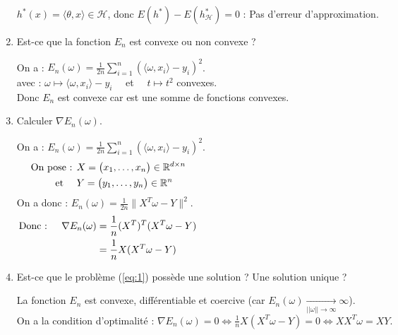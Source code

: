 \documentclass[12pt,a4paper]{article}
\begin{document}
\begin{enumerate}
    $h^*(x) = \langle \theta, x \rangle \in \mathcal{H}$, donc $E(h^*) - E(h^*_\mathcal{H}) = 0$ : Pas d'erreur d'approximation.\\
    

    \color{black}
    \item Est-ce que la fonction $E_n$ est convexe ou non convexe ?
    
    \color{blue}
    On a : $E_n(\omega) = \frac{1}{2n} \sum_{i = 1}^{n} (\langle \omega, x_i \rangle - y_i)^2$.\\
    avec : $\omega \mapsto \langle \omega, x_i \rangle - y_i \quad$ et $\quad t \mapsto t^2$ convexes.\\
    
    Donc $E_n$ est convexe car  est une somme de fonctions convexes.\\

    \color{black}
    \item Calculer $\nabla E_n(\omega)$.
    
    \color{blue}
    On a : $E_n(\omega) = \frac{1}{2n} \sum_{i = 1}^{n} (\langle \omega, x_i \rangle - y_i)^2$.
    \begin{align*}
        \text{On pose : } &X = \begin{pmatrix}
            x_1, \dots , x_n \\
        \end{pmatrix} \in \mathbb{R}^{d \times n} \hspace{14.5cm}\\
        \text{ et } \quad &Y = \begin{pmatrix}
            y_1, \dots , y_n \\
        \end{pmatrix} \in \mathbb{R}^{n}
    \end{align*}
    On a donc : $E_n(\omega) = \frac{1}{2n} \|X^T \omega - Y\|^2$.
    \begin{align*}
        \text{Donc : } \quad \nabla E_n(\omega) &= \frac{1}{n}(X^T)^T(X^T \omega - Y) \hspace{14.5cm}\\
        &= \frac{1}{n} X(X^T \omega - Y)
    \end{align*}


    \color{black}
    \item Est-ce que le problème (\ref{eq:1}) possède une solution ?
    Une solution unique ?

    \color{blue}
    La fonction $E_n$ est convexe, différentiable et coercive (car $E_n(\omega) \xrightarrow[||\omega || \rightarrow \infty]{} \infty$).\\
    On a la condition d'optimalité : $\nabla E_n(\omega) = 0 \Leftrightarrow \frac{1}{n} X(X^T \omega - Y) = 0 \Leftrightarrow X X^T \omega = XY$.\\


\end{enumerate}
\end{document}
